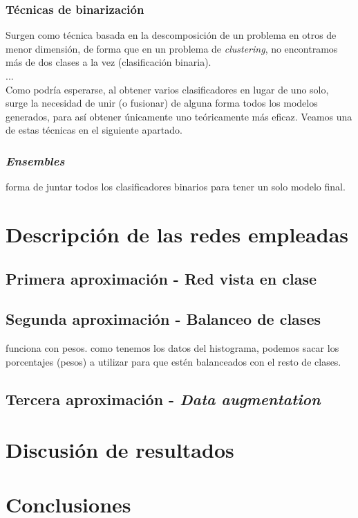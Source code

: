 \documentclass[]{scrartcl}
\begin{document}
		\subsubsection{Técnicas de binarización}
		
			Surgen como técnica basada en la descomposición de un problema en otros de menor dimensión, de forma que en un problema de \textit{clustering}, no encontramos más de dos clases a la vez (clasificación binaria).\\
			
			...\\
			
			Como podría esperarse, al obtener varios clasificadores en lugar de uno solo, surge la necesidad de unir (o fusionar) de alguna forma todos los modelos generados, para así obtener únicamente uno teóricamente más eficaz. Veamos una de estas técnicas en el siguiente apartado.
		
		\subsubsection{\textit{Ensembles}}
		
			forma de juntar todos los clasificadores binarios para tener un solo modelo final.

\section{Descripción de las redes empleadas}

	\subsection{Primera aproximación - Red vista en clase}
	
	\subsection{Segunda aproximación - Balanceo de clases}
	
	funciona con pesos. como tenemos los datos del histograma, podemos sacar los porcentajes (pesos) a utilizar para que estén balanceados con el resto de clases.
	
	\subsection{Tercera aproximación - \textit{Data augmentation}}
	
\section{Discusión de resultados}

\section{Conclusiones}



\end{document}
